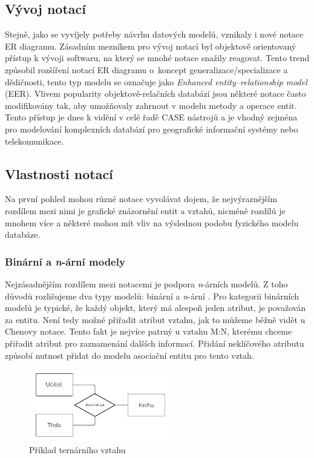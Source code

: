 \documentclass[czech,bachelor,public,dept460,male,oneside]{diploma}
\begin{document}
	\subsection{Vývoj notací}
	Stejně, jako se vyvíjely potřeby návrhu datových modelů, vznikaly i nové notace ER diagramu. Zásadním mezníkem pro vývoj notací byl objektově orientovaný přístup k vývoji softwaru, na který se mnohé notace snažily reagovat. Tento trend způsobil rozšíření notací ER diagramu o~koncept generalizace/specializace a dědičnosti, tento typ modelu se označuje jako \emph{Enhanced entity–relationship model} (EER). Vlivem popularity objektově-relačních databází jsou některé notace často modifikovány tak, aby umožňovaly zahrnout v modelu metody a operace entit. Tento přístup je dnes k vidění v celé řadě CASE nástrojů a je vhodný zejména pro modelování komplexních databází pro geografické informační systémy nebo telekomunikace.
	
	\subsection{Vlastnosti notací}
	Na první pohled mohou různé notace vyvolávat dojem, že nejvýraznějším rozdílem mezi nimi je grafické znázornění entit a vztahů, nicméně rozdílů je mnohem více a některé mohou mít vliv na výslednou podobu fyzického modelu databáze.
		
		\subsubsection{Binární a \textit{n}-ární modely}
		Nejzásadnějším rozdílem mezi notacemi je podpora \textit{n}-árních modelů. Z toho důvodů rozlišujeme dva typy modelů: binární a \textit{n}-ární \cite{compErNotations}. Pro kategorii binárních modelů je typické, že každý objekt, který má alespoň jeden atribut, je považován za entitu. Není tedy možné přiřadit atribut vztahu, jak to můžeme běžně vidět u Chenovy notace. Tento fakt je nejvíce patrný u vztahu M:N, kterému chceme přiřadit atribut pro zaznamenání dalších informací. Přidání neklíčového atributu způsobí nutnost přidat do modelu asociační entitu pro tento vztah. 
		
		\begin{figure}[H]
			\centering
			\includegraphics[width=0.55\textwidth]{Figures/TernaryRelationship2}
			\caption{Příklad ternárního vztahu}
			\label{fig:ternaryEx}
		\end{figure}
		
\end{document}
